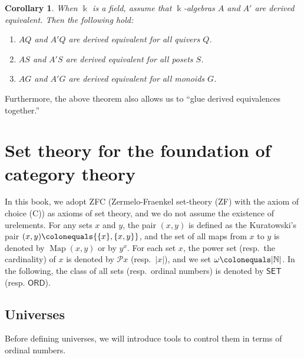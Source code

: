 \documentclass{surv-l}
\numberwithin{equation}{chapter}
\numberwithin{figure}{chapter}
\theoremstyle{plain}
\newtheorem{cor}[thm]{Corollary}
\theoremstyle{definition}
\theoremstyle{remark}
\DeclareMathOperator{\Map}{Map}
\begin{document}
\begin{cor}
When $\Bbbk$ is a field,
assume that $\Bbbk$-algebras $A$ and $A'$ are derived equivalent.
Then the following hold:
\begin{enumerate}
\item
$AQ$ and $A'Q$ are derived equivalent for all quivers $Q$.
\item
$AS$ and $A'S$ are derived equivalent for all posets $S$.
\item
$AG$ and $A'G$ are derived equivalent for all monoids $G$.
\end{enumerate}
\end{cor}

Furthermore, the above theorem also allows us to ``glue derived equivalences together.''

\appendix

\setcounter{chapter}{0}
\renewcommand{\thechapter}{\Alph{chapter}}

\chapter{Set theory for the foundation of category theory}\label{ch:found}\label{app:a}
In this book, we adopt ZFC (Zermelo-Fraenkel set-theory (ZF) with the axiom of choice (C)) as axioms of set theory,
and we do not assume the existence of urelements.
For any sets $x$ and $y$, the pair $(x, y)$ is defined as
the Kuratowski's pair $(x, y)\colonequals  \{\{x\}, \{x, y\}\}$, and the set of all maps
from $x$ to $y$ is denoted by $\Map(x, y)$ or by $y^x$.
For each set $x$, the power set (resp.\ the cardinality) of $x$
is denoted by $\mathcal{P} x$ (resp.\ $|x|$), and we set $\omega\colonequals  |\mathbb{N}|$.
In the following, the class of all sets (resp.\ ordinal numbers) is denoted by
$\mathsf{SET}$ (resp. $\mathsf{ORD}$).

\section{Universes}Before defining universes, we will introduce tools to control them in terms of ordinal numbers.
\end{document}
